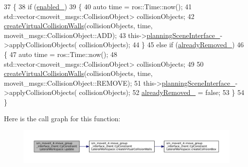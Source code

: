 \begin{DoxyCode}
37         \{
38             \textcolor{keywordflow}{if} (\hyperlink{classsm__moveit__4_1_1move__group__interface__client_1_1CpConstraintLateralWorkspace_a7981810bd40955300bb7ba724361d4d7}{enabled\_})
39             \{
40                 \textcolor{keyword}{auto} time = ros::Time::now();
41                 std::vector<moveit\_msgs::CollisionObject> collisionObjects;
42                 \hyperlink{classsm__moveit__4_1_1move__group__interface__client_1_1CpConstraintLateralWorkspace_a8c1b043abc9d74c603becad16ddcc420}{createVirtualCollisionWalls}(collisionObjects, time, 
      moveit\_msgs::CollisionObject::ADD);
43                 this->\hyperlink{classsm__moveit__4_1_1move__group__interface__client_1_1CpConstraintLateralWorkspace_a4fc20ba3e0f44b4a85b1db67d3d6ce28}{planningSceneInterface\_}->applyCollisionObjects(
      collisionObjects);
44             \}
45             \textcolor{keywordflow}{else} \textcolor{keywordflow}{if} (\hyperlink{classsm__moveit__4_1_1move__group__interface__client_1_1CpConstraintLateralWorkspace_af7cdd50e89bd65438ea95c509ba883a4}{alreadyRemoved\_})
46             \{
47                 \textcolor{keyword}{auto} time = ros::Time::now();
48                 std::vector<moveit\_msgs::CollisionObject> collisionObjects;
49 
50                 \hyperlink{classsm__moveit__4_1_1move__group__interface__client_1_1CpConstraintLateralWorkspace_a8c1b043abc9d74c603becad16ddcc420}{createVirtualCollisionWalls}(collisionObjects, time, 
      moveit\_msgs::CollisionObject::REMOVE);
51                 this->\hyperlink{classsm__moveit__4_1_1move__group__interface__client_1_1CpConstraintLateralWorkspace_a4fc20ba3e0f44b4a85b1db67d3d6ce28}{planningSceneInterface\_}->applyCollisionObjects(
      collisionObjects);
52                 \hyperlink{classsm__moveit__4_1_1move__group__interface__client_1_1CpConstraintLateralWorkspace_af7cdd50e89bd65438ea95c509ba883a4}{alreadyRemoved\_} = \textcolor{keyword}{false};
53             \}
54         \}
\end{DoxyCode}
Here is the call graph for this function\+:
\nopagebreak
\begin{figure}[H]
\begin{center}
\leavevmode
\includegraphics[width=350pt]{classsm__moveit__4_1_1move__group__interface__client_1_1CpConstraintLateralWorkspace_a2f4341da0a276e9d9f792f61ef18528c_cgraph}
\end{center}
\end{figure}

